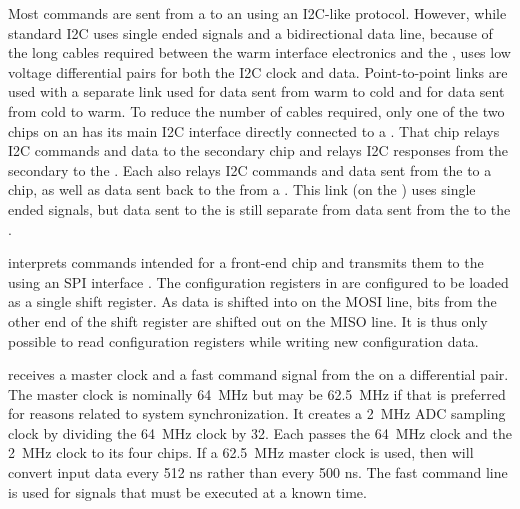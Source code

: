 Most commands are sent from a  to an  using an I2C-like\cite{I2C} protocol.  However, while standard I2C uses single ended  signals and a bidirectional data line, because of the long cables required between the warm interface electronics and the ,  uses low voltage differential pairs for both the I2C clock and data.  Point-to-point links are used with a separate link used for data sent from warm to cold and for data sent from cold to warm.  To reduce the number of cables required, only one of the two  chips on an  has its main I2C interface directly connected to a .  That  chip relays I2C commands and data to the secondary  chip and relays I2C responses from the secondary  to the .  Each  also relays I2C commands and data sent from the  to a  chip, as well as data sent back to the   from a .  This link (on the ) uses single ended  signals, but data sent to the  is still separate from data sent from the  to the .

 interprets commands intended for a  front-end chip and transmits them to the  using an SPI\cite{SPI} interface .  The configuration registers in  are configured to be loaded as a single shift register.  As data is shifted into  on the MOSI  line, bits from the other end of the shift register are shifted out on the MISO  line.  It is thus only possible to read  configuration registers while writing new configuration data.

 receives a master clock and a fast command signal from the  on a differential pair.  The master clock is nominally \SI{64}{MHz} but may be \SI{62.5}{MHz} if that is preferred for reasons related to system synchronization.  It creates a \SI{2}{MHz} ADC sampling clock by dividing the \SI{64}{MHz} clock by 32.  Each  passes the \SI{64}{MHz} clock and the \SI{2}{MHz} clock to its four  chips.  If a \SI{62.5}{MHz} master clock is used, then  will convert input data every 512 ns rather than every 500 ns.  The fast command line is used for signals that must be executed at a known time.


